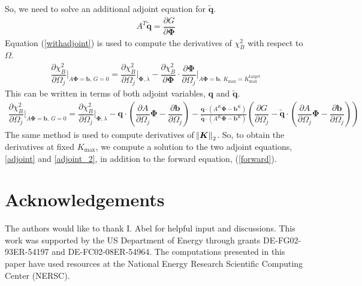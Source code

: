 \documentclass[aps,unsortedaddress]{revtex4-1}
\newcommand{\partder}[2]{\dfrac{\partial  #1}{\partial  #2}}
\begin{document}
So, we need to solve an additional adjoint equation for $\tilde{\bm{q}}$.
\begin{gather}
A^T \tilde{\bm{q}} = \partder{G}{\bm{\Phi}}
\label{adjoint_2}
\end{gather}
Equation (\ref{withadjoint}) is used to compute the derivatives of $\chi^2_B$ with respect to $\Omega$.
\begin{gather}
\partder{\chi^2_B}{\Omega_j} \bigg \rvert_{A \bm{\Phi} = \bm{b}, \, G = 0} = \partder{\chi^2_B}{\Omega_j} \bigg \rvert_{\bm{\Phi}, \lambda} - \partder{\chi^2_B}{\bm{\Phi}} \cdot \partder{\bm{\Phi}}{\Omega_j} \bigg \rvert_{A \bm{\Phi} = \bm{b}, \, K_{\text{max}} = K_{\text{max}}^{\text{target}}}
\end{gather}
This can be written in terms of both adjoint variables, $\bm{q}$ and $\tilde{\bm{q}}$. 
\begin{multline}
\partder{\chi^2_B}{\Omega_j} \bigg \rvert_{A \bm{\Phi} = \bm{b}, \, G = 0} = \partder{\chi^2_B}{\Omega_j} \bigg \rvert_{\bm{\Phi}, \lambda} - \bm{q} \cdot \left( \partder{A}{\Omega_j} \bm{\Phi} - \partder{\bm{b}}{\Omega_j} \right) - \frac{ \bm{q} \cdot \left(A^K \bm{\Phi} - \bm{b}^K \right)}{  \tilde{\bm{q}} \cdot \left( A^K \bm{\Phi} - \bm{b}^K \right) } \left( \partder{G}{\Omega_j} - \tilde{\bm{q}} \cdot \left( \partder{A}{\Omega_j} \bm{\Phi} - \partder{\bm{b}}{\Omega_j} \right) \right)
\end{multline}
The same method is used to compute derivatives of $\norm{\bm{K}}_2$. So, to obtain the derivatives at fixed $K_{\text{max}}$, we compute a solution to the two adjoint equations, \ref{adjoint} and \ref{adjoint_2}, in addition to the forward equation, (\ref{forward}).


\section*{Acknowledgements}
The authors would like to thank I. Abel for helpful input and discussions. This work was supported by the US Department of Energy through grants DE-FG02-93ER-54197 and DE-FC02-08ER-54964. The computations presented in this paper have used resources at the National Energy Research Scientific Computing Center (NERSC). 

\raggedright


\end{document}
